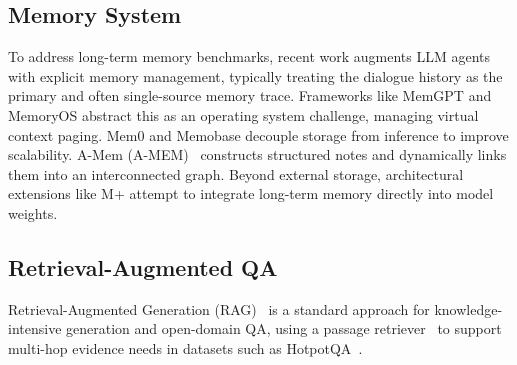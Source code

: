 \documentclass{article}
\theoremstyle{plain}
\theoremstyle{definition}
\theoremstyle{remark}
\begin{document}

\subsection{Memory System}
To address long-term memory benchmarks, recent work augments LLM agents with explicit memory management, typically treating the dialogue history as the primary and often single-source memory trace. Frameworks like MemGPT \citep{packer2024memgpt} and MemoryOS \citep{kang2025memoryos} abstract this as an operating system challenge, managing virtual context paging.  Mem0 \citep{chhikara2025mem0} and Memobase \citep{memodb2024memobase} decouple storage from inference to improve scalability. A-Mem (A-MEM)~\citep{xu2025amem} constructs structured notes and dynamically links them into an interconnected graph. Beyond external storage, architectural extensions like M+ \citep{wang2025mplus} attempt to integrate long-term memory directly into model weights. 

\subsection{Retrieval-Augmented QA}
Retrieval-Augmented Generation (RAG)~\citep{lewis2020rag} is a standard approach for knowledge-intensive generation and open-domain QA,  using a passage retriever~\citep{Karpukhin2020DPR} to support multi-hop evidence needs in datasets such as HotpotQA~\citep{hotpotqa}.  
\end{document}
